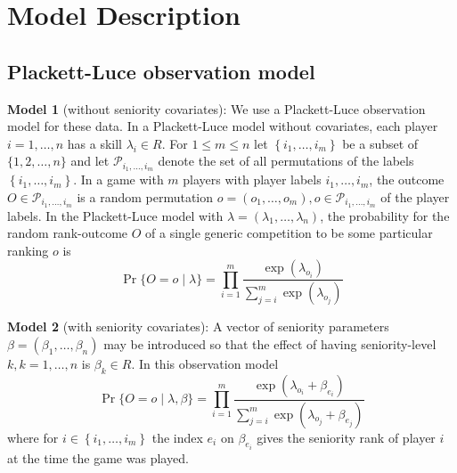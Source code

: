 \section{Model Description}
\subsection{Plackett-Luce observation model}
\textbf{Model 1} (without seniority covariates): We use a Plackett-Luce observation model for these data. In a Plackett-Luce model without covariates, each player $i=1, \ldots, n$ has a skill $\lambda_{i} \in R$. For $1 \leq m \leq n$ let $\left\{i_{1}, \ldots, i_{m}\right\}$ be a subset of $\{1,2, \ldots, n\}$ and let $\mathcal{P}_{i_{1}, \ldots, i_{m}}$ denote the set of all permutations of the labels $\left\{i_{1}, \ldots, i_{m}\right\}$. In a game with $m$ players with player labels $i_{1}, \ldots, i_{m}$, the outcome $O \in \mathcal{P}_ {i_{1}, \ldots, i_{m}}$ is a random permutation $o= \left(o_{1}, \ldots, o_{m}\right), o \in \mathcal{P}_{i_{1}, \ldots, i_{m}}$ of the player labels. In the Plackett-Luce model with $\lambda=\left(\lambda_{1}, \ldots, \lambda_{n} \right)$, the probability for the random rank-outcome $O$ of a single generic competition to be some particular ranking $o$ is
\begin{equation*}
\operatorname{Pr}\{O=o \mid \lambda\}=\prod_{i=1}^{m} \frac{\exp \left(\lambda_{o_{i}}\right)}{\sum_{j=i}^{m} \exp \left(\lambda_{o_{j}}\right)}
\end{equation*}

\textbf{Model 2} (with seniority covariates): A vector of seniority parameters $\beta=\left(\beta_{1}, \ldots, \beta_{n}\right)$ may be introduced so that the effect of having seniority-level $k, k=1, \ldots, n$ is $\beta_{k} \in R$. In this observation model
\begin{equation*}
\operatorname{Pr}\{O=o \mid \lambda, \beta\}=\prod_{i=1}^{m} \frac{\exp \left(\lambda_{o_{i}}+\beta_{e_{i}}\right)}{\sum_{j=i}^{m} \exp \left(\lambda_{o_{j}}+\beta_{e_{j}}\right)}
\end{equation*}
where for $i \in\left\{i_{1}, \ldots, i_{m}\right\}$ the index $e_{i}$ on $\beta_{e_{i}}$ gives the seniority rank of player $i$ at the time the game was played.

